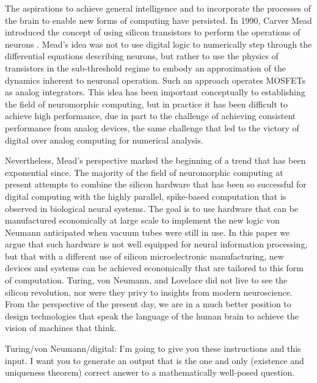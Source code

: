 \documentclass[twocolumn]{article}
\begin{document}
The aspirations to achieve general intelligence and to incorporate the processes of the brain to enable new forms of computing have persisted. In 1990, Carver Mead introduced the concept of using silicon transistors to perform the operations of neurons \cite{me1990}. Mead's idea was not to use digital logic to numerically step through the differential equations describing neurons, but rather to use the physics of transistors in the sub-threshold regime to embody an approximation of the dynamics inherent to neuronal operation. Such an approach operates MOSFETs as analog integrators. This idea has been important conceptually to establishing the field of neuromorphic computing, but in practice it has been difficult to achieve high performance, due in part to the challenge of achieving consistent performance from analog devices, the same challenge that led to the victory of digital over analog computing for numerical analysis. 

Nevertheless, Mead's perspective marked the beginning of a trend that has been exponential since. The majority of the field of neuromorphic computing at present attempts to combine the silicon hardware that has been so successful for digital computing with the highly parallel, spike-based computation that is observed in biological neural systems. The goal is to use hardware that can be manufactured economically at large scale to implement the new logic von Neumann anticipated when vacuum tubes were still in use. In this paper we argue that such hardware is not well equipped for neural information processing, but that with a different use of silicon microelectronic manufacturing, new devices and systems can be achieved economically that are tailored to this form of computation. Turing, von Neumann, and Lovelace did not live to see the silicon revolution, nor were they privy to insights from modern neuroscience. From the perspective of the present day, we are in a much better position to design technologies that speak the language of the human brain to achieve the vision of machines that think.

 
\vspace{4em}
Turing/von Neumann/digital: I'm going to give you these instructions and this input. I want you to generate an output that is the one and only (existence and uniqueness theorem) correct answer to a mathematically well-posed question.
\end{document}

